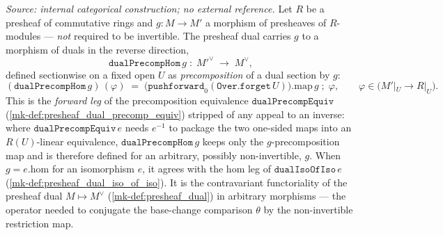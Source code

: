 \begin{definition}\label{mk-def:presheaf_dual_precomp_hom}
  \leanok

  \textit{Source: internal categorical construction; no external reference.}
  Let \(R\) be a presheaf of commutative rings and \(g : M \to M'\) a morphism of presheaves of
  \(R\)-modules --- \emph{not} required to be invertible. The presheaf dual carries \(g\) to a
  morphism of duals in the reverse direction,
  \[
    \mathtt{dualPrecompHom}\,g \;\colon\; M'^\vee \;\longrightarrow\; M^\vee,
  \]
  defined sectionwise on a fixed open \(U\) as \emph{precomposition} of a dual section by \(g\):
  \[
    (\mathtt{dualPrecompHom}\,g)\,(\varphi) \;=\;
      \bigl(\mathtt{pushforward}_0(\mathtt{Over.forget}\,U)\bigr).\mathrm{map}\,g
        \;\mathbin{;}\; \varphi,
      \qquad \varphi \in \bigl(M'|_U \to R|_U\bigr).
  \]
  This is the \emph{forward leg} of the precomposition equivalence \(\mathtt{dualPrecompEquiv}\)
  (\ref{mk-def:presheaf_dual_precomp_equiv}) stripped of any appeal to an inverse: where
  \(\mathtt{dualPrecompEquiv}\,e\) needs \(e^{-1}\) to package the two one-sided maps into an
  \(R(U)\)-linear equivalence, \(\mathtt{dualPrecompHom}\,g\) keeps only the \(g\)-precomposition map
  and is therefore defined for an arbitrary, possibly non-invertible, \(g\). When
  \(g = e.\mathrm{hom}\) for an isomorphism \(e\), it agrees with the \(\mathrm{hom}\) leg of
  \(\mathtt{dualIsoOfIso}\,e\) (\ref{mk-def:presheaf_dual_iso_of_iso}). It is the contravariant
  functoriality of the presheaf dual \(M \mapsto M^\vee\) (\ref{mk-def:presheaf_dual}) in arbitrary
  morphisms --- the operator needed to conjugate the base-change comparison \(\theta\) by the
  non-invertible restriction map.
\end{definition}

